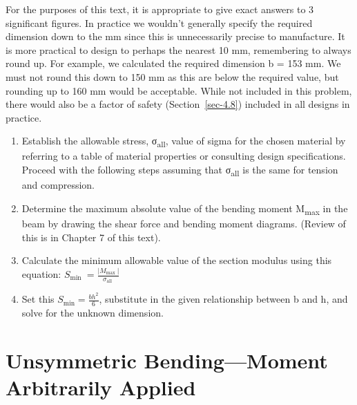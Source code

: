\documentclass[
  letterpaper,
  DIV=11,
  numbers=noendperiod]{scrreprt}
\providecommand{\tightlist}{%
  \setlength{\itemsep}{0pt}\setlength{\parskip}{0pt}}\usepackage{longtable,booktabs,array}
\begin{document}
For the purposes of this text, it is appropriate to give exact answers
to 3 significant figures. In practice we wouldn't generally specify the
required dimension down to the mm since this is unnecessarily precise to
manufacture. It is more practical to design to perhaps the nearest 10
mm, remembering to always round up. For example, we calculated the
required dimension b = 153 mm. We must not round this down to 150 mm as
this are below the required value, but rounding up to 160 mm would be
acceptable. While not included in this problem, there would also be a
factor of safety (Section~\ref{sec-4.8}) included in all designs in
practice.

\begin{tcolorbox}[enhanced jigsaw, breakable, opacityback=0, toptitle=1mm, left=2mm, colback=white, opacitybacktitle=0.6, colframe=quarto-callout-warning-color-frame, titlerule=0mm, arc=.35mm, leftrule=.75mm, bottomtitle=1mm, colbacktitle=quarto-callout-warning-color!10!white, rightrule=.15mm, title={Step-by-step: Most Economical Beam Design (rectangular sections)}, bottomrule=.15mm, toprule=.15mm, coltitle=black]

\begin{enumerate}
\def\labelenumi{\arabic{enumi}.}
\tightlist
\item
  Establish the allowable stress, σ\textsubscript{all}, value of sigma
  for the chosen material by referring to a table of material properties
  or consulting design specifications. Proceed with the following steps
  assuming that σ\textsubscript{all} is the same for tension and
  compression.
\item
  Determine the maximum absolute value of the bending moment
  \textbar M\textsubscript{max}\textbar{} in the beam by drawing the
  shear force and bending moment diagrams. (Review of this is in Chapter
  7 of this text).
\item
  Calculate the minimum allowable value of the section modulus using
  this equation:
  \(S_{\text {min }}=\frac{\left|M_{\text {max }}\right|}{\sigma_{\text {all }}}\)
\item
  Set this \(S_{\min }=\frac{b h^2}{6}\), substitute in the given
  relationship between b and h, and solve for the unknown dimension.
\end{enumerate}

\end{tcolorbox}

\section{Unsymmetric Bending---Moment Arbitrarily
Applied}\label{sec-9.3}
\end{document}
